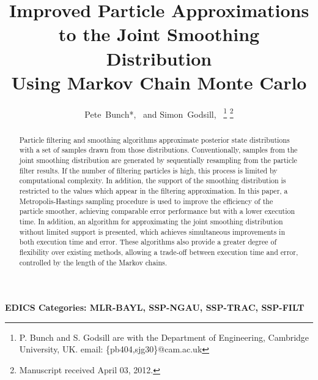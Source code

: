 \documentclass[peerreview,11pt,draftcls,onecolumn]{IEEEtran}
\begin{document}
\title{Improved Particle Approximations \\ to the Joint Smoothing Distribution \\ Using Markov Chain Monte Carlo}

\author{Pete~Bunch*,~ and
        Simon~Godsill,~%
\thanks{P. Bunch and S. Godsill are with the Department
of Engineering, Cambridge University, UK. email: \{pb404,sjg30\}@cam.ac.uk}%
\thanks{Manuscript received April 03, 2012.}}


\maketitle


\begin{abstract}
Particle filtering and smoothing algorithms approximate posterior state distributions with a set of samples drawn from those distributions. Conventionally, samples from the joint smoothing distribution are generated by sequentially resampling from the particle filter results. If the number of filtering particles is high, this process is limited by computational complexity. In addition, the support of the smoothing distribution is restricted to the values which appear in the filtering approximation. In this paper, a Metropolis-Hastings sampling procedure is used to improve the efficiency of the particle smoother, achieving comparable error performance but with a lower execution time. In addition, an algorithm for approximating the joint smoothing distribution without limited support is presented, which achieves simultaneous improvements in both execution time and error. These algorithms also provide a greater degree of flexibility over existing methods, allowing a trade-off between execution time and error, controlled by the length of the Markov chains.
\end{abstract}




\ifCLASSOPTIONpeerreview
\begin{center} \bfseries EDICS Categories: MLR-BAYL, SSP-NGAU, SSP-TRAC, SSP-FILT \end{center}
\fi
\end{document}
